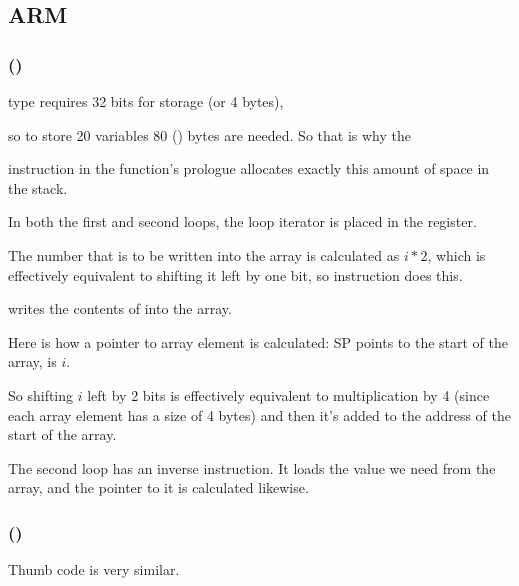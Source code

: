 \subsection{ARM}

\subsubsection{\NonOptimizingKeilVI (\ARMMode)}



\Tint type requires 32 bits for storage (or 4 bytes),

so to store 20 \Tint variables 80 () bytes are needed.
So that is why the  

instruction in the function's prologue allocates exactly this amount of space in the stack.

In both the first and second loops, the loop iterator  is placed in the  register.


The number that is to be written into the array is calculated as $i*2$, which is effectively equivalent 
to shifting it left by one bit, so  instruction does this.

 writes the contents of  into the array.

Here is how a pointer to array element is calculated: \ac{SP} points to the start of the array,  is $i$.

So shifting $i$ left by 2 bits is effectively equivalent to multiplication by 4
(since each array element has a size of 4 bytes) and then it's added to the address of the start of the array.


The second loop has an inverse 
instruction. It loads the value we need from the array, and the pointer to it is calculated likewise.

\subsubsection{\OptimizingKeilVI (\ThumbMode)}



Thumb code is very similar.

